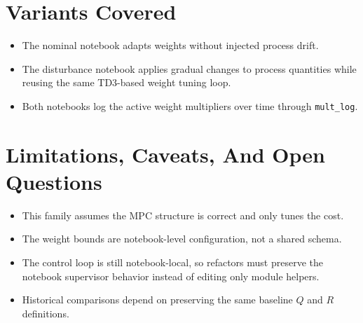\documentclass[11pt]{article}
\begin{document}
\section*{Variants Covered}

\begin{itemize}
\item The nominal notebook adapts weights without injected process drift.
\item The disturbance notebook applies gradual changes to process quantities
      while reusing the same TD3-based weight tuning loop.
\item Both notebooks log the active weight multipliers over time through
      \texttt{mult\_log}.
\end{itemize}

\section*{Limitations, Caveats, And Open Questions}

\begin{itemize}
\item This family assumes the MPC structure is correct and only tunes the cost.
\item The weight bounds are notebook-level configuration, not a shared schema.
\item The control loop is still notebook-local, so refactors must preserve the
      notebook supervisor behavior instead of editing only module helpers.
\item Historical comparisons depend on preserving the same baseline
      $Q$ and $R$ definitions.
\end{itemize}
\end{document}
